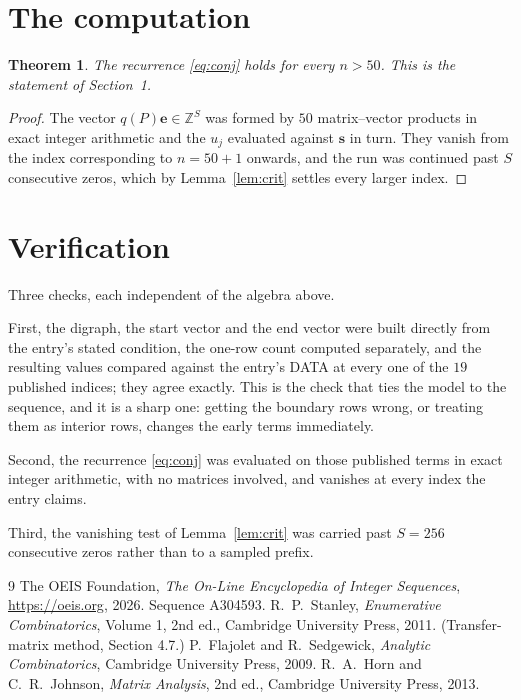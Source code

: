 \documentclass[11pt,a4paper]{article}
\theoremstyle{plain}
\newtheorem{theorem}{Theorem}
\theoremstyle{definition}
\begin{document}
\section{The computation}

\begin{theorem}
The recurrence \eqref{eq:conj} holds for every $n>50$. This is the statement of
Section~1.
\end{theorem}

\begin{proof}
The vector $q(P)\mathbf{e}\in\mathbb{Z}^{S}$ was formed by $50$ matrix--vector
products in exact integer arithmetic and the $u_j$ evaluated against $\mathbf{s}$ in turn.
They vanish from the index corresponding to $n=50+1$ onwards, and the run was continued
past $S$ consecutive zeros, which by Lemma~\ref{lem:crit} settles every larger index.
\end{proof}

\section{Verification}

Three checks, each independent of the algebra above.

First, the digraph, the start vector and the end vector were built directly from the
entry's stated condition, the one-row count computed separately, and the resulting values
compared against the entry's DATA at every one of the $19$ published indices; they
agree exactly. This is the check that ties the model to the sequence, and it is a sharp one:
getting the boundary rows wrong, or treating them as interior rows, changes the early terms
immediately.

Second, the recurrence \eqref{eq:conj} was evaluated on those published terms in exact
integer arithmetic, with no matrices involved, and vanishes at every index the entry claims.

Third, the vanishing test of Lemma~\ref{lem:crit} was carried past $S=256$ consecutive
zeros rather than to a sampled prefix.

\begin{thebibliography}{9}
 The OEIS Foundation, \emph{The On-Line Encyclopedia of Integer
Sequences}, \url{https://oeis.org}, 2026. Sequence A304593.
 R.~P.~Stanley, \emph{Enumerative Combinatorics}, Volume 1, 2nd ed.,
Cambridge University Press, 2011. (Transfer-matrix method, Section 4.7.)
 P.~Flajolet and R.~Sedgewick, \emph{Analytic Combinatorics}, Cambridge
University Press, 2009.
 R.~A.~Horn and C.~R.~Johnson, \emph{Matrix Analysis}, 2nd ed., Cambridge
University Press, 2013.
\end{thebibliography}
\end{document}
